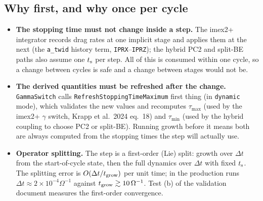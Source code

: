 \documentclass[11pt]{article}
\newcommand{\code}[1]{\texttt{#1}}
\newcommand{\fn}[1]{\texttt{\small #1}}
\newcommand{\ts}{t_{\rm s}}
\begin{document}
\subsection{Why first, and why once per cycle}
\begin{itemize}
\item \textbf{The stopping time must not change inside a step.} The imex2+ integrator
  records drag rates at one implicit stage and applies them at the next (the
  \code{a\_twid} history term, \code{IPRX}--\code{IPRZ}); the hybrid PC2 and split-BE
  paths also assume one $\ts$ per step. All of this is consumed within one cycle, so a
  change between cycles is safe and a change between stages would not be.
\item \textbf{The derived quantities must be refreshed after the change.}
  \fn{GammaSwitch} calls \fn{RefreshStoppingTimeMaximum} first thing (in
  \code{dynamic} mode), which validates the new values and recomputes $\tau_{\max}$
  (used by the imex2+ $\gamma$ switch, Krapp et al.\ 2024 eq.~18) and $\tau_{\min}$ (used
  by the hybrid coupling to choose PC2 or split-BE). Running growth before it means
  both are always computed from the stopping times the step will actually use.
\item \textbf{Operator splitting.} The step is a first-order (Lie) split: growth over
  $\Delta t$ from the start-of-cycle state, then the full dynamics over $\Delta t$ with
  fixed $\ts$. The splitting error is $O(\Delta t/t_{\rm grow})$ per unit time; in the
  production runs $\Delta t\approx2\times10^{-4}\Omega^{-1}$ against
  $t_{\rm grow}\gtrsim10\,\Omega^{-1}$. Test (b) of the validation document measures
  the first-order convergence.
\end{itemize}

\end{document}
